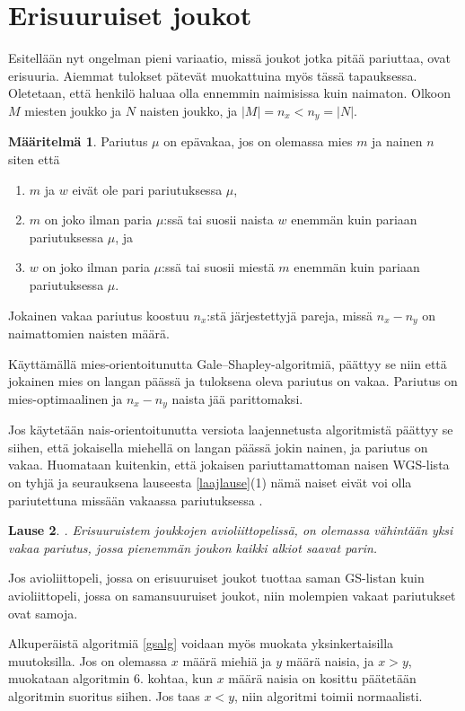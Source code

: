 \documentclass[finnish]{tktltiki2}
\newtheorem{lau}{Lause}
\theoremstyle{definition}
\newtheorem{maar}[lau]{Määritelmä}
\theoremstyle{remark}
\begin{document}
\section{Erisuuruiset joukot}
Esitellään nyt ongelman pieni variaatio, missä joukot jotka pitää pariuttaa, ovat erisuuria. Aiemmat tulokset pätevät muokattuina myös tässä tapauksessa. Oletetaan, että henkilö haluaa olla ennemmin naimisissa kuin naimaton.
Olkoon $M$ miesten joukko ja $N$ naisten joukko, ja $|M| = n_x < n_y = |N|$.

\begin{maar}
 Pariutus $\mu$ on epävakaa, jos on olemassa mies $m$ ja nainen $n$ siten että
\begin{enumerate}
	\item $m$ ja $w$ eivät ole pari pariutuksessa $\mu$,
	\item $m$ on joko ilman paria $\mu$:ssä tai suosii naista $w$ enemmän kuin pariaan pariutuksessa $\mu$, ja
	\item $w$ on joko ilman paria $\mu$:ssä tai suosii miestä $m$ enemmän kuin pariaan pariutuksessa $\mu$.
\end{enumerate}
\end{maar}

Jokainen vakaa pariutus koostuu $n_x$:stä järjestettyjä pareja, missä $n_x - n_y$ on naimattomien naisten määrä.

Käyttämällä mies-orientoitunutta Gale--Shapley-algoritmiä, päättyy  se niin että jokainen mies on langan päässä ja tuloksena oleva pariutus on vakaa. Pariutus on mies-optimaalinen ja $n_x - n_y$ naista jää parittomaksi.

Jos käytetään nais-orientoitunutta versiota laajennetusta algoritmistä päättyy se siihen, että jokaisella miehellä on langan päässä jokin nainen, ja pariutus on vakaa. Huomataan kuitenkin, että jokaisen pariuttamattoman naisen WGS-lista on tyhjä ja seurauksena lauseesta \ref{laajlause}(1) nämä naiset eivät voi olla pariutettuna missään vakaassa pariutuksessa \cite[s. 26]{gusfield1989stable}.

\begin{lau}\cite[p. 26]{gusfield1989stable}.
Erisuuruistem joukkojen avioliittopelissä, on olemassa vähintään yksi vakaa pariutus, jossa pienemmän joukon kaikki alkiot saavat parin.
\end{lau}
Jos avioliittopeli, jossa on erisuuruiset joukot tuottaa saman GS-listan kuin avioliittopeli, jossa on samansuuruiset joukot, niin molempien vakaat pariutukset ovat samoja.

Alkuperäistä algoritmiä \ref{gsalg} voidaan myös muokata yksinkertaisilla muutoksilla. Jos on olemassa $x$ määrä miehiä ja $y$ määrä naisia, ja $x > y$, muokataan algoritmin 6. kohtaa, kun $x$ määrä naisia on kosittu päätetään algoritmin suoritus siihen. Jos taas $x < y$, niin algoritmi toimii normaalisti.
\end{document}
